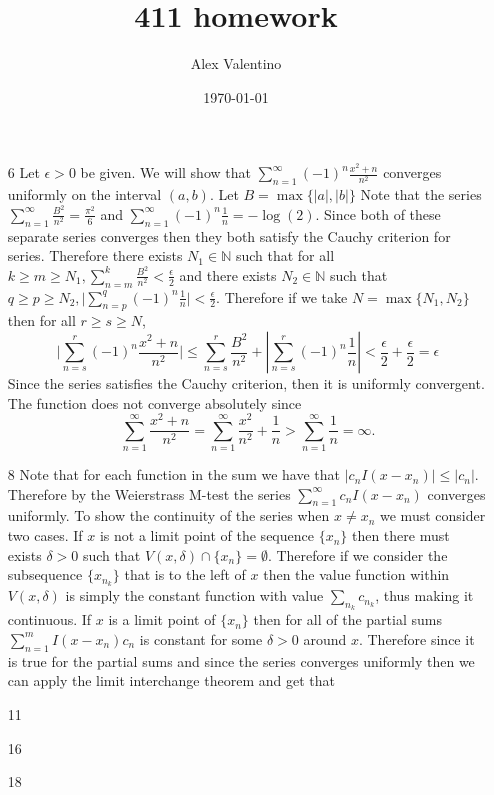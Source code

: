 \documentclass[12pt, letterpaper]{article}
\date{\today}
\author{Alex Valentino}
\title{411 homework}
\newcommand{\N}{\mathbb{N}}
\begin{document}
\begin{enumerate}
	\item[6]
	Let $\epsilon > 0$ be given.  We will show that $\sum_{n=1}^\infty (-1)^n \frac{x^2 + n}{n^2}$ converges uniformly on
	the interval $(a,b)$.  Let $B = \max\{|a|,|b|\}$   Note that the series $\sum_{n=1}^\infty \frac{B^2}{n^2} = \frac{\pi^2}{6}$ and $\sum_{n=1}^\infty (-1)^n \frac{1}{n} = -\log(2)$.  Since both of these separate series converges 
	then they both satisfy the Cauchy criterion for series.  Therefore there exists $N_1 \in \N$ such that for all 
	$k \geq m \geq N_1, \sum_{n=m}^k \frac{B^2}{n^2}  < \frac{\epsilon}{2}$ and there exists $N_2 \in \N$ 
	such that $q \geq p \geq N_2, \lvert \sum_{n = p}^q (-1)^n \frac{1}{n} \rvert < \frac{\epsilon}{2}$.  Therefore if
	we take $N = \max \{N_1, N_2\}$ then for all $r \geq s \geq N$, 
	$$
	\lvert \sum_{n = s}^r (-1)^n \frac{x^2 + n}{n^2} \rvert \leq \sum_{n = s}^r \frac{B^2}{n^2} + |\sum_{n = s}^r (-1)^n \frac{1}{n}| < \frac{\epsilon}{2} + \frac{\epsilon}{2} = \epsilon
	$$  
	Since the series satisfies the Cauchy criterion, then it is uniformly convergent.  \\
	The function does not converge absolutely since 
	$$
	\sum_{n=1}^\infty \frac{x^2 + n}{n^2} = \sum_{n=1}^\infty \frac{x^2}{n^2} + \frac{1}{n} > \sum_{n=1}^\infty \frac{1}{n} = \infty.
	$$
	\item[8] Note that for each function in the sum we have that $|c_n I(x - x_n)| \leq |c_n|$.  Therefore by the 
	Weierstrass M-test the series $\sum_{n=1}^\infty c_n I(x-x_n)$ converges uniformly.  To show the continuity of 
	the series when $x \neq x_n$ we must consider two cases.  If $x$ is not a limit point of the sequence $\{x_n\}$ then 
	there must exists $\delta > 0$ such that $V(x,\delta) \cap \{x_n\} = \emptyset$.  Therefore if we consider 
	the subsequence $\{x_{n_k}\}$ that is to the left of $x$ then the value function within $V(x,\delta)$ is simply the 
	constant function with value $\sum_{n_k} c_{n_k}$, thus making it continuous.  If $x$ is a limit point of $\{x_n\}$ then for all of the partial sums $\sum_{n=1}^m I(x-x_n) c_n$ is constant for some $\delta > 0$ around $x$.  Therefore 
	since it is true for the partial sums and since the series converges uniformly then we can apply the limit 
	interchange theorem and get that $$
	
	\item[11]
	\item[16]
	\item[18]
\end{enumerate}
\end{document}
